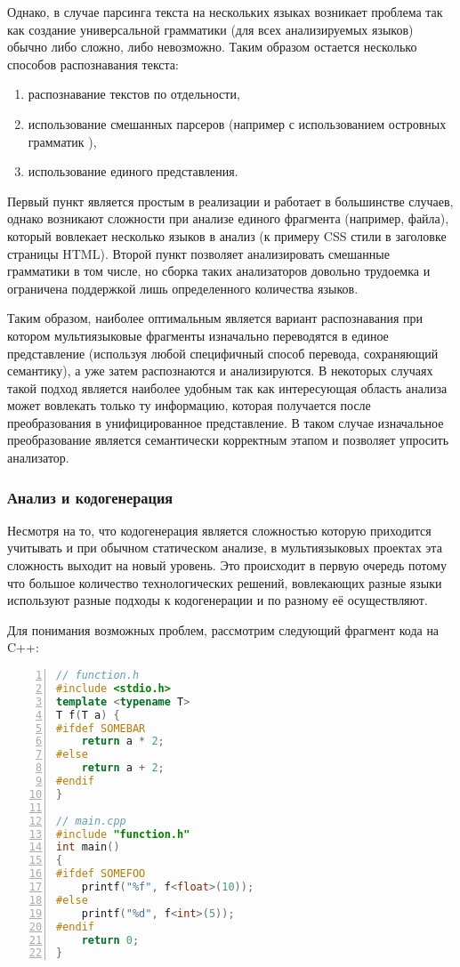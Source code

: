 Однако, в случае парсинга текста на нескольких языках возникает проблема так как создание универсальной
грамматики (для всех анализируемых языков) обычно либо сложно, либо невозможно. Таким образом остается
несколько способов распознавания текста:
\begin{enumerate}[label=\arabic*.]
    \item распознавание текстов по отдельности,
    \item использование смешанных парсеров (например с использованием островных грамматик \cite{island-grammars}),
    \item использование единого представления.
\end{enumerate}
Первый пункт является простым в реализации и работает в большинстве случаев, однако
возникают сложности при анализе единого фрагмента (например, файла), который вовлекает несколько
языков в анализ (к примеру CSS стили в заголовке страницы HTML). Второй пункт позволяет анализировать
смешанные грамматики в том числе, но сборка таких анализаторов довольно трудоемка и ограничена поддержкой
лишь определенного количества языков.

Таким образом, наиболее оптимальным является вариант распознавания при котором мультиязыковые фрагменты
изначально переводятся в единое представление (используя любой специфичный способ перевода, сохраняющий семантику), а
уже затем распознаются и анализируются. В некоторых случаях такой подход является наиболее удобным так как
интересующая область анализа может вовлекать только ту информацию, которая получается после преобразования в унифицированное
представление. В таком случае изначальное преобразование является семантически корректным этапом и позволяет
упросить анализатор.

\subsubsection{Анализ и кодогенерация}

Несмотря на то, что кодогенерация является сложностью которую приходится учитывать и при обычном
статическом анализе, в мультиязыковых проектах эта сложность выходит на новый уровень.
Это происходит в первую очередь потому что большое количество технологических решений, вовлекающих
разные языки используют разные подходы к кодогенерации и по разному её осуществляют.

Для понимания возможных проблем, рассмотрим следующий фрагмент кода на C++:
\begin{lstlisting}[numbers=left, language=C++]
// function.h
#include <stdio.h>
template <typename T>
T f(T a) {
#ifdef SOMEBAR
    return a * 2;
#else
    return a + 2;
#endif
}

// main.cpp
#include "function.h"
int main()
{
#ifdef SOMEFOO
    printf("%f", f<float>(10));
#else
    printf("%d", f<int>(5));
#endif
    return 0;
}
\end{lstlisting}

